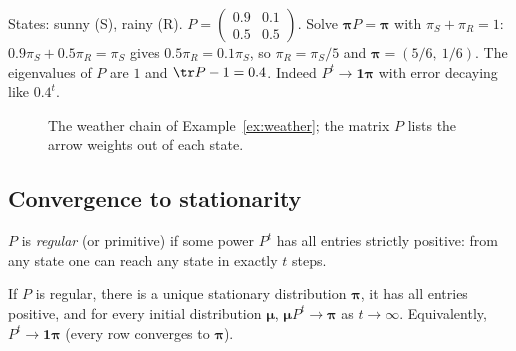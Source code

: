 \begin{example}\label{ex:weather}
States: sunny (S), rainy (R). $P=\begin{pmatrix}0.9&0.1\\0.5&0.5\end{pmatrix}$. Solve $\boldsymbol\pi P=\boldsymbol\pi$ with $\pi_S+\pi_R=1$: $0.9\pi_S+0.5\pi_R=\pi_S$ gives $0.5\pi_R=0.1\pi_S$, so $\pi_R=\pi_S/5$ and $\boldsymbol\pi=(5/6,\ 1/6)$. The eigenvalues of $P$ are $1$ and $\tr P-1=0.4$. Indeed $P^t\to\mathbf{1}\boldsymbol\pi$ with error decaying like $0.4^t$.
\end{example}

\begin{figure}[h]
\centering
{}
\caption{The weather chain of Example~\ref{ex:weather}; the matrix $P$ lists the arrow weights out of each state.}
\end{figure}

\subsection*{Convergence to stationarity}

\begin{definition}
$P$ is \emph{regular} (or primitive) if some power $P^t$ has all entries strictly positive: from any state one can reach any state in exactly $t$ steps.
\end{definition}

\begin{theorem}\label{thm:markovconv}
If $P$ is regular, there is a unique stationary distribution $\boldsymbol\pi$, it has all entries positive, and for every initial distribution $\boldsymbol\mu$, $\boldsymbol\mu P^t\to\boldsymbol\pi$ as $t\to\infty$. Equivalently, $P^t\to\mathbf{1}\boldsymbol\pi$ (every row converges to $\boldsymbol\pi$).
\end{theorem}

